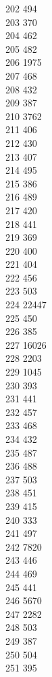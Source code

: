 { 202	494 \\
 203	370 \\
 204	462 \\
 205	482 \\
 206	1975 \\
 207	468 \\
 208	432 \\
 209	387 \\
 210	3762 \\
 211	406 \\
 212	430 \\
 213	407 \\
 214	495 \\
 215	386 \\
 216	489 \\
 217	420 \\
 218	441 \\
 219	369 \\
 220	400 \\
 221	404 \\
 222	456 \\
 223	503 \\
 224	22447 \\
 225	450 \\
 226	385 \\
 227	16026 \\
 228	2203 \\
 229	1045 \\
 230	393 \\
 231	441 \\
 232	457 \\
 233	468 \\
 234	432 \\
 235	487 \\
 236	488 \\
 237	503 \\
 238	451 \\
 239	415 \\
 240	333 \\
 241	497 \\
 242	7820 \\
 243	446 \\
 244	469 \\
 245	441 \\
 246	5670 \\
 247	2282 \\
 248	503 \\
 249	387 \\
 250	504 \\
 251	395 \\
}
